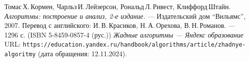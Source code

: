 \begin{thebibliography}{99}
Томас\,Х.\,Кормен, Чарльз\,И.\,Лейзерсон, Рональд\,Л.\,Ривест, Клиффорд\,Штайн.
{\itshape Алгоритмы: построение и анализ, 2-е издание.} --- Издательский дом \enquote{Вильямс}, 2007. Перевод с английского: И.\,В.\,Красиков, Н.\,А.\,Орехова, В.\,Н.\,Романов. --- 1296 с. (ISBN 5-8459-0857-4 (рус.))
{\itshape Жадные алгоритмы — Яндекс образование} \\URL: \texttt{https://education.yandex.ru/handbook/algorithms/article/zhadnye-algoritmy} (дата обращения: 12.11.2024).
\end{thebibliography}
\pagebreak
